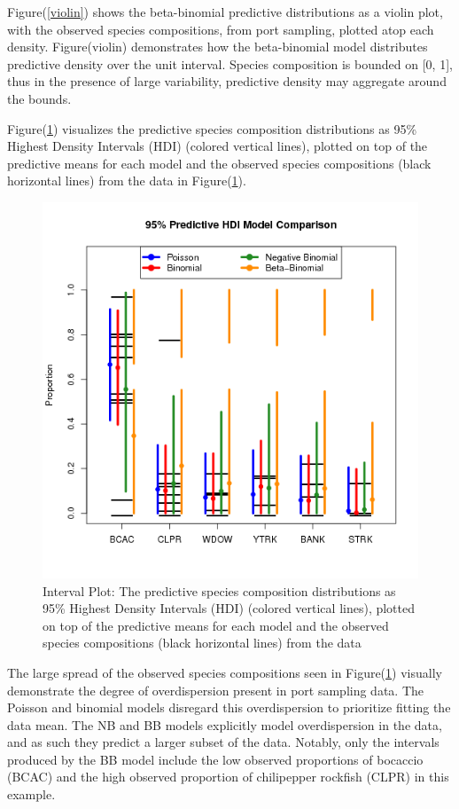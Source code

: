 \documentclass[12pt]{article}
\begin{document}
Figure(\ref{violin}) shows the beta-binomial predictive distributions as a
violin plot, with the observed species compositions, from port sampling,
plotted atop each density. Figure(violin) demonstrates how the
beta-binomial model distributes predictive density over the unit
interval. Species composition is bounded on {[}0, 1{]}, thus in the
presence of large variability, predictive density may aggregate around
the bounds.

Figure(\ref{interval}) visualizes the predictive species composition
distributions as 95\% Highest Density Intervals (HDI) (colored vertical
lines), plotted on top of the predictive means for each model and the
observed species compositions (black horizontal lines) from the data in
Figure(\ref{interval}).

\begin{figure}[h!]
\centering
\includegraphics{./pictures/compPlot1982Qtr2.png}
\caption{Interval Plot: The predictive species composition distributions
as 95\% Highest Density Intervals (HDI) (colored vertical lines),
plotted on top of the predictive means for each model and the observed
species compositions (black horizontal lines) from the data}
\label{interval}
\end{figure}

The large spread of the observed species compositions seen in
Figure(\ref{interval}) visually demonstrate the degree of overdispersion
present in port sampling data. The Poisson and binomial models disregard
this overdispersion to prioritize fitting the data mean. The NB and BB
models explicitly model overdispersion in the data, and as such they
predict a larger subset of the data. Notably, only the intervals
produced by the BB model include the low observed proportions of
bocaccio (BCAC) and the high observed proportion of chilipepper rockfish
(CLPR) in this example.
\end{document}
